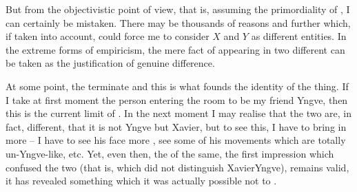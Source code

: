 But from the objectivistic point of view, that is, assuming the primordiality of
, I can certainly be mistaken.  There may be
thousands of reasons and further  which, if taken into
account, could force me to consider $X$ and $Y$ as different
entities. In the extreme forms of empiricism, the mere fact of appearing in two 
different  can be taken as the justification of genuine
difference. 

\pa At some point, the  terminate and this is what founds the
identity of the  thing.  If I take at first moment the person
entering the room to be my friend Yngve, then this is the current limit of
.  In the next moment I may realise that the two are, in fact,
different, that it is not Yngve but Xavier, but to see this, I have to bring in
more  -- I have to see his face more , see some
of his movements which are totally un-Yngve-like, etc.  Yet, even then, the
 of the same, the first impression which confused the two (that
is, which did not distinguish XavierYngve), remains valid, it has revealed
something which it was actually possible not to .


\label{th:identity}


